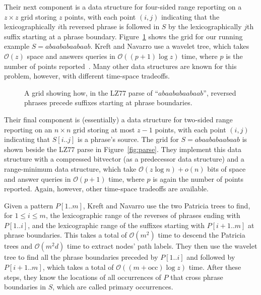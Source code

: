 \documentclass[review]{elsarticle}
\newcommand{\Oh}[1]
    {\ensuremath{\mathcal{O}\!\left( {#1} \right)}}
\newcommand{\occ}
    {\ensuremath{\mathrm{occ}}}
\begin{document}
Their next component is a data structure for four-sided range reporting on a \(z \times z\) grid storing $z$ points, with each point \((i, j)\) indicating that the lexicographically $i$th reversed phrase is followed in $S$ by the lexicographically $j$th suffix starting at a phrase boundary.  Figure~\ref{fig:grid} shows the grid for our running example \(S = abaababaabaab\).  Kreft and Navarro use a wavelet tree, which takes $\Oh{z}$ space and answers queries in $\Oh{(p + 1) \log z}$ time, where $p$ is the number of points reported~\cite{Nav12}.  Many other data structures are known for this problem, however, with different time-space tradeoffs.

\begin{figure}[t]
\begin{center}
\caption{A grid showing how, in the LZ77 parse of ``\(abaababaabaab\)'', reversed phrases precede suffixes starting at phrase boundaries.}
\label{fig:grid}
\end{center}
\end{figure}

Their final component is (essentially) a data structure for two-sided range reporting on an \(n \times n\) grid storing at most \(z - 1\) points, with each point \((i, j)\) indicating that \(S [i..j]\) is a phrase's source.  The grid for \(S = abaababaabaab\) is shown beside the LZ77 parse in Figure~\ref{fig:parse}.  They implement this data structure with a compressed bitvector (as a predecessor data structure) and a range-minimum data structure, which take \(\Oh{z \log n} + o (n)\) bits of space and answer queries in $\Oh{p + 1}$ time, where $p$ is again the number of points reported.  Again, however, other time-space tradeoffs are available.

Given a pattern \(P [1..m]\), Kreft and Navarro use the two Patricia trees to find, for \(1 \leq i \leq m\), the lexicographic range of the reverses of phrases ending with \(P [1..i]\), and the lexicographic range of the suffixes starting with \(P [i + 1..m]\) at phrase boundaries.  This takes a total of $\Oh{m^2}$ time to descend the Patricia trees and $\Oh{m^2 d}$ time to extract nodes' path labels.  They then use the wavelet tree to find all the phrase boundaries preceded by \(P [1..i]\) and followed by \(P [i + 1..m]\), which takes a total of $\Oh{(m + \occ) \log z}$ time.  After these steps, they know the locations of all occurrences of $P$ that cross phrase boundaries in $S$, which are called primary occurrences.
\end{document}
